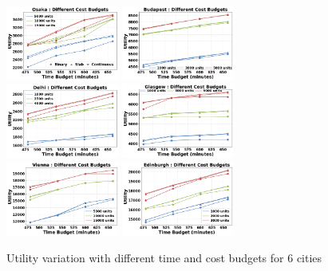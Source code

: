 \begin{figure}[t]
    \includegraphics[width=0.33\textwidth]{plots/exp1-osaka.png}
    \includegraphics[width=0.33\textwidth]{plots/exp1-budapest.png}
    \includegraphics[width=0.33\textwidth]{plots/exp1-delhi.png}
    \includegraphics[width=0.33\textwidth]{plots/exp1-glasgow.png}
    \includegraphics[width=0.33\textwidth]{plots/exp1-vienna.png}
    \includegraphics[width=0.33\textwidth]{plots/exp1-edinburgh.png}
    \caption{Utility variation with different time and cost budgets for 6 cities}
    \label{fig:cities}
\end{figure}

